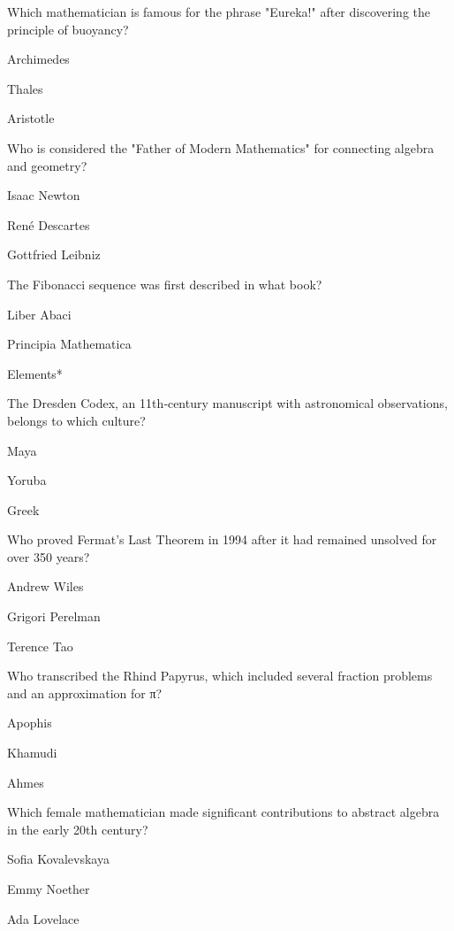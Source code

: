 \begin{enhancedmcq}{Which mathematician is famous for the phrase "Eureka!" after discovering the principle of buoyancy?}
\item Archimedes
\item Thales
\item Aristotle

\end{enhancedmcq}
\begin{enhancedmcq}{Who is considered the "Father of Modern Mathematics" for connecting algebra and geometry?}
\item Isaac Newton
\item René Descartes
\item Gottfried Leibniz

\end{enhancedmcq}
\begin{enhancedmcq}{The Fibonacci sequence was first described in what book?}
\item Liber Abaci
\item Principia Mathematica
\item *Elements*

\end{enhancedmcq}
\begin{enhancedmcq}{The Dresden Codex, an 11th‑century manuscript with astronomical observations, belongs to which culture?}
\item Maya
\item Yoruba
\item Greek

\end{enhancedmcq}
\begin{enhancedmcq}{Who proved Fermat's Last Theorem in 1994 after it had remained unsolved for over 350 years?}
\item Andrew Wiles
\item Grigori Perelman
\item Terence Tao

\end{enhancedmcq}
\begin{enhancedmcq}{Who transcribed the Rhind Papyrus, which included several fraction problems and an approximation for π?}
\item Apophis
\item Khamudi
\item Ahmes

\end{enhancedmcq}
\begin{enhancedmcq}{Which female mathematician made significant contributions to abstract algebra in the early 20th century?}
\item Sofia Kovalevskaya
\item Emmy Noether
\item Ada Lovelace

\end{enhancedmcq}
